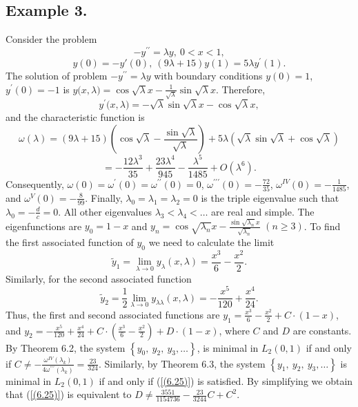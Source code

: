 \documentclass[10pt,a4paper]{amsart}
\numberwithin{equation}{section}
\begin{document}
\subsection*{Example 3.}Consider the problem  
$$
-y^{\prime \prime }=\lambda y,\ 0<x<1,
$$
$$
y(0)=-y'(0),\ 
(9{\lambda}+15)y(1)= 5{\lambda }y^{\prime }(1).
$$
The solution of problem $-y^{\prime \prime }=\lambda y$ with boundary conditions $y(0)=1$, $y^\prime(0)=-1$ is $y({x,\lambda)}=\cos{\sqrt{\lambda}x}-\frac{1}{\sqrt{\lambda}}\sin{\sqrt{\lambda}x}$. Therefore, $$y^\prime({x,\lambda)}=-\sqrt{\lambda}\sin{\sqrt{\lambda}x}-\cos{\sqrt{\lambda}x},$$and
the characteristic function is $$\omega(\lambda) = (9{\lambda}+15)\left(\cos{\sqrt{\lambda}}-\frac{\sin{\sqrt{\lambda}}}{{\sqrt{\lambda}}} \right)+5\lambda\left(\sqrt{\lambda}\sin{\sqrt{\lambda}} +\cos{\sqrt{\lambda}}\right)
$$
$$
=-\frac{12\lambda^{3}}{35}+\frac{23\lambda^{4}}{945}-\frac{\lambda^{5}}{1485}+O(\lambda^{6}).
$$
Consequently, $\omega(0)=\omega^\prime(0)=\omega^{\prime\prime}(0)=0$, $\omega^{\prime\prime\prime}(0)=-\frac{72}{35}$, $\omega^{IV}(0)=-\frac{1}{1485}$, and $\omega^{V}(0)=-\frac{8}{99}$.
Finally, $\lambda _{0}=\lambda _{1}=\lambda _{2}=0$ is the triple eigenvalue such that $\lambda _{0}=-\frac{d}{c}=0$. All other eigenvalues $\lambda _{3}<\lambda _{4}<\ldots$ are real and simple.
The eigenfunctions are $y_{0}=1-x$ and $y_{n}=\cos{\sqrt{\lambda _{n}}x}-\frac{\sin{\sqrt{\lambda_n}x}}{{\sqrt{\lambda_n}}}$ $(n\ge 3)$.
To find the first associated function of $y_{0}$ we need to calculate the limit
$$\tilde{y}_1=\lim_{\lambda\to 0}y_\lambda(x,\lambda)=\frac{x^3}{6}-\frac{x^2}{2}.$$
Similarly, for the second associated function
$$\tilde{y}_2=\frac{1}{2}\lim_{\lambda\to 0}y_{\lambda\lambda}(x,\lambda)=-\frac{x^5}{120}+\frac{x^4}{24}.$$
Thus, the first and second associated functions are 
$y_{1}=\frac{x^{3}}{6}-\frac{x^{2}}{2}+C\cdot \left(1-x\right)$, and $y_{2}=-\frac{x^{5}}{120}+\frac{x^{4}}{24}+C\cdot \left(\frac{x^{3}}{6}-\frac{x^{2}}{2}\right)+{D}\cdot \left(1-x\right)$, where $C$ and $D$ are constants. 
By Theorem 6.2,
the system $\left\{ y_{0},\ y_{2},\ y_{3},\ldots\right\}$, is minimal in $L_2(0,1)$ if and only if $C\neq-\frac{\omega^{IV}(\lambda_k)}{4\omega^{\prime\prime\prime}(\lambda_k)}=\frac{23}{324}$. 
Similarly, by Theorem 6.3,
the system $\left\{ y_{1},\ y_{2},\ y_{3},\ldots\right\}$ is minimal in $L_2(0,1)$ if and only if (\ref{(6.25)}) is satisfied. By simplifying we obtain that (\ref{(6.25)}) is equivalent to $D\ne\frac{3551}{1154736}-\frac{23}{3244} C+C^{2}$.
\end{document}
